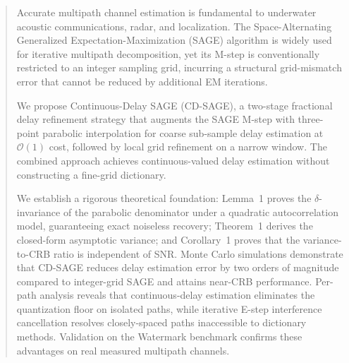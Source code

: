 \documentclass[a4paper,fleqn]{cas-dc}
\newcommand{\bigO}{\mathcal{O}}
\begin{document}

\fntext[1]{}


\begin{abstract}
Accurate multipath channel estimation is fundamental to underwater acoustic communications, radar, and localization. The Space-Alternating Generalized Expectation-Maximization (SAGE) algorithm is widely used for iterative multipath decomposition, yet its M-step is conventionally restricted to an integer sampling grid, incurring a structural grid-mismatch error that cannot be reduced by additional EM iterations.

We propose Continuous-Delay SAGE (CD-SAGE), a two-stage fractional delay refinement strategy that augments the SAGE M-step with three-point parabolic interpolation for coarse sub-sample delay estimation at $\bigO(1)$ cost, followed by local grid refinement on a narrow window. The combined approach achieves continuous-valued delay estimation without constructing a fine-grid dictionary.

We establish a rigorous theoretical foundation: Lemma~1 proves the $\delta$-invariance of the parabolic denominator under a quadratic autocorrelation model, guaranteeing exact noiseless recovery; Theorem~1 derives the closed-form asymptotic variance; and Corollary~1 proves that the variance-to-CRB ratio is independent of SNR. Monte Carlo simulations demonstrate that CD-SAGE reduces delay estimation error by two orders of magnitude compared to integer-grid SAGE and attains near-CRB performance. Per-path analysis reveals that continuous-delay estimation eliminates the quantization floor on isolated paths, while iterative E-step interference cancellation resolves closely-spaced paths inaccessible to dictionary methods. Validation on the Watermark benchmark confirms these advantages on real measured multipath channels.
\end{abstract}


\begin{highlights}
\item 
\item 
\item 
\end{highlights}
\end{document}
